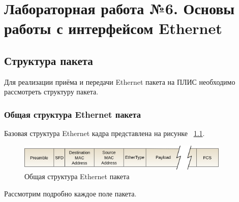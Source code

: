 \chapter{Лабораторная работа №6. Основы работы с интерфейсом Ethernet}

\section{Структура пакета}
Для реализации приёма и передачи Ethernet пакета на ПЛИС необходимо рассмотреть структуру пакета. 

\subsection{Общая структура Ethernet пакета}

Базовая структура Ethernet кадра представлена на рисунке ~\ref{Ethernet_frame}. 

\begin{figure}[h]
	\centering
	\includegraphics[width=0.9\textwidth]{image/Ethernet_frame}
	\caption{Общая структура Ethernet пакета}
	\label{Ethernet_frame}
\end{figure}

Рассмотрим подробно каждое поле пакета.

